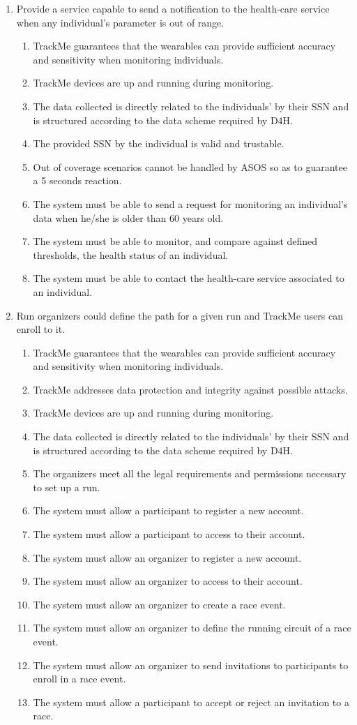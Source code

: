 \documentclass[a4paper, hidelinks, 12pt]{report}
\newcommand\requirement[1]{\item[{[R#1]}] }
\newcommand\goal[1]{\item[{[G#1]}] }
\newcommand\assumption[1]{\item[{[D#1]}] }
\begin{document}
\begin{enumerate}
		\goal{5} Provide a service capable to send a notification to the health-care service when any individual's parameter is out of range.
		\begin{enumerate}
			\assumption{1} TrackMe guarantees that the wearables can provide sufficient accuracy and sensitivity when monitoring individuals.
			\assumption{3} TrackMe devices are up and running during monitoring.
			\assumption{4} The data collected is directly related to the individuals' by their SSN and is structured according to the data scheme required by D4H.
			\assumption{5} The provided SSN by the individual is valid and trustable.
			\assumption{6} Out of coverage scenarios cannot be handled by ASOS so as to guarantee a 5 seconds reaction.
			\requirement{13} The system must be able to send a request for monitoring an individual's data when he/she is older than 60 years old.
			\requirement{14} The system must be able to monitor, and compare against defined thresholds, the health status of an individual.
			\requirement{15} The system must be able to contact the health-care service associated to an individual.
		\end{enumerate}
		
		\goal{6} Run organizers could define the path for a given run and TrackMe users can enroll to it.
		\begin{enumerate}
			\assumption{1} TrackMe guarantees that the wearables can provide sufficient accuracy and sensitivity when monitoring individuals.
			\assumption{2} TrackMe addresses data protection and integrity against possible attacks.
			\assumption{3} TrackMe devices are up and running during monitoring.
			\assumption{4} The data collected is directly related to the individuals' by their SSN and is structured according to the data scheme required by D4H.
			\assumption{7} The organizers meet all the legal requirements and permissions necessary to set up a run.
			\requirement{16} The system must allow a participant to register a new account.
			\requirement{17} The system must allow a participant to access to their account.
			\requirement{18} The system must allow an organizer to register a new account.
			\requirement{19} The system must allow an organizer to access to their account.
			\requirement{20} The system must allow an organizer to create a race event.
			\requirement{21} The system must allow an organizer to define the running circuit of a race event.
			\requirement{22} The system must allow an organizer to send invitations to participants to enroll in a race event.
			\requirement{23} The system must allow a participant to accept or reject an invitation to a race.
		\end{enumerate}
		

\end{enumerate}
\end{document}
